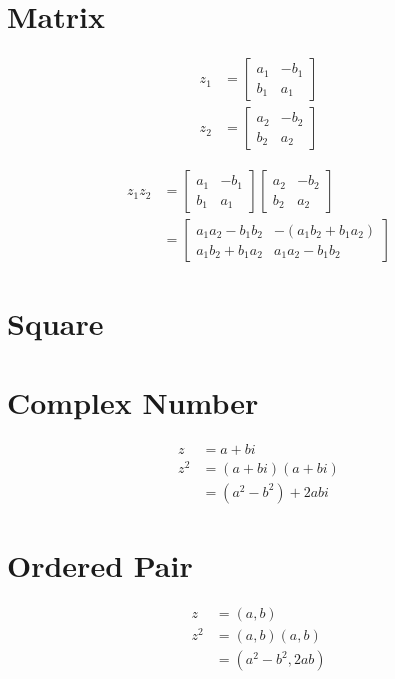 \documentclass[10pt]{article}
\begin{document}
\section{Matrix}
$$
\begin{aligned}
z_{1} & =\left[\begin{array}{ll}
a_{1} & -b_{1} \\
b_{1} & a_{1}
\end{array}\right] \\
z_{2} & =\left[\begin{array}{cc}
a_{2} & -b_{2} \\
b_{2} & a_{2}
\end{array}\right]
\end{aligned}
$$

$$
\begin{aligned}
z_{1} z_{2} & =\left[\begin{array}{cc}
a_{1} & -b_{1} \\
b_{1} & a_{1}
\end{array}\right]\left[\begin{array}{cc}
a_{2} & -b_{2} \\
b_{2} & a_{2}
\end{array}\right] \\
& =\left[\begin{array}{cc}
a_{1} a_{2}-b_{1} b_{2} & -\left(a_{1} b_{2}+b_{1} a_{2}\right) \\
a_{1} b_{2}+b_{1} a_{2} & a_{1} a_{2}-b_{1} b_{2}
\end{array}\right]
\end{aligned}
$$

\section{Square}
\section{Complex Number}
$$
\begin{aligned}
z & =a+b i \\
z^{2} & =(a+b i)(a+b i) \\
& =\left(a^{2}-b^{2}\right)+2 a b i
\end{aligned}
$$

\section{Ordered Pair}
$$
\begin{aligned}
z & =(a, b) \\
z^{2} & =(a, b)(a, b) \\
& =\left(a^{2}-b^{2}, 2 a b\right)
\end{aligned}
$$
\end{document}
